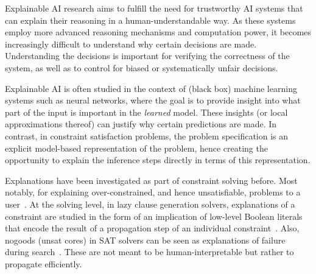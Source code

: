 

Explainable AI research aims to fulfill the need for trustworthy AI systems that can explain their reasoning in a human-understandable way. 
As these systems employ more advanced reasoning mechanisms and computation power, it becomes increasingly difficult to understand why certain decisions are made. 
Understanding the decisions is important for verifying the correctness of the system, as well as to control for biased or systematically unfair decisions.

Explainable AI is often studied in the context of (black box) machine learning systems such as neural networks, where the goal is to provide insight into what part of the input is important in the \textit{learned} model. These insights (or local approximations thereof) can justify why certain predictions are made. In contrast, in constraint satisfaction problems, the problem specification is an explicit model-based representation of the problem, hence creating the opportunity to explain the inference steps directly in terms of this representation.

Explanations have been investigated as part of constraint solving before. Most notably, for explaining over-constrained, and hence unsatisfiable, problems to a user~\cite{junker2001quickxplain}. At the solving level, in lazy clause generation solvers, explanations of a constraint are studied in the form of an implication of low-level Boolean literals that encode the result of a propagation step of an individual constraint~\cite{feydy2009lazy}. Also, nogoods (unsat cores) in SAT solvers can be seen as explanations of failure during search~\cite{marques2009conflict}. These are not meant to be human-interpretable but rather to propagate efficiently.

